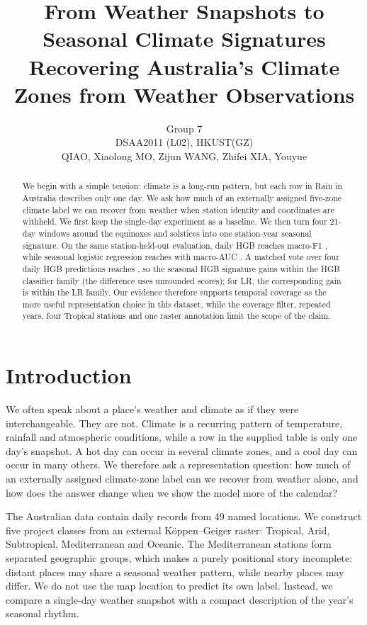 \documentclass{article}
\title{From Weather Snapshots to Seasonal Climate Signatures\\Recovering Australia's Climate Zones from Weather Observations}
\author{Group 7\\DSAA2011 (L02), HKUST(GZ)\\QIAO, Xiaolong \quad MO, Zijun \quad WANG, Zhifei \quad XIA, Youyue}
\begin{document}
\maketitle

\begin{abstract}
We begin with a simple tension: climate is a long-run pattern, but each row in Rain in Australia describes only one day. We ask how much of an externally assigned five-zone climate label we can recover from weather when station identity and coordinates are withheld. We first keep the single-day experiment as a baseline. We then turn four 21-day windows around the equinoxes and solstices into one station-year seasonal signature. On the same station-held-out evaluation, daily HGB reaches macro-F1 \DailyHGB{}, while seasonal logistic regression reaches \SeasonLR{} with macro-AUC \SeasonLRAUC{}. A matched vote over four daily HGB predictions reaches \MatchedDaily{}, so the seasonal HGB signature gains \SeasonGain{} within the HGB classifier family (the difference uses unrounded scores); for LR, the corresponding gain is \SeasonLRGain{} within the LR family. Our evidence therefore supports temporal coverage as the more useful representation choice in this dataset, while the coverage filter, repeated years, four Tropical stations and one raster annotation limit the scope of the claim.
\end{abstract}

\section{Introduction}
We often speak about a place's weather and climate as if they were interchangeable. They are not. Climate is a recurring pattern of temperature, rainfall and atmospheric conditions, while a row in the supplied table is only one day's snapshot. A hot day can occur in several climate zones, and a cool day can occur in many others. We therefore ask a representation question: how much of an externally assigned climate-zone label can we recover from weather alone, and how does the answer change when we show the model more of the calendar?

The Australian data contain daily records from 49 named locations. We construct five project classes from an external Köppen--Geiger raster: Tropical, Arid, Subtropical, Mediterranean and Oceanic. The Mediterranean stations form separated geographic groups, which makes a purely positional story incomplete: distant places may share a seasonal weather pattern, while nearby places may differ. We do not use the map location to predict its own label. Instead, we compare a single-day weather snapshot with a compact description of the year's seasonal rhythm.
\end{document}
